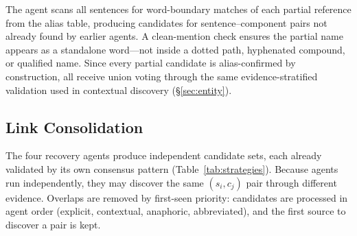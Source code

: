 The agent scans all sentences for word-boundary matches of each
partial reference from the alias table, producing candidates for
sentence--component pairs not already found by earlier agents.
A clean-mention check ensures the partial name appears as a
standalone word---not inside a dotted path, hyphenated compound, or
qualified name.
Since every partial candidate is alias-confirmed by construction,
all receive union voting through the same evidence-stratified
validation used in contextual discovery (\S\ref{sec:entity}).


\subsection{Link Consolidation}\label{sec:merge}

The four recovery agents produce independent candidate
sets, each already validated by its own consensus pattern
(Table~\ref{tab:strategies}).
Because agents run independently, they may discover the
same $(s_i, c_j)$ pair through different evidence.
Overlaps are removed by first-seen priority:
candidates are processed in agent order
(explicit, contextual, anaphoric, abbreviated),
and the first source to discover a pair is kept.
